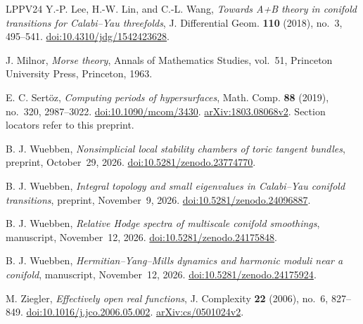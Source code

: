 \begin{thebibliography}{LPPV24}
Y.-P. Lee, H.-W. Lin, and C.-L. Wang,
\emph{Towards A+B theory in conifold transitions for Calabi--Yau threefolds},
J. Differential Geom. \textbf{110} (2018), no.~3, 495--541.
\href{https://doi.org/10.4310/jdg/1542423628}
{doi:10.4310/jdg/1542423628}.

J. Milnor, \emph{Morse theory}, Annals of Mathematics Studies,
vol.~51, Princeton University Press, Princeton, 1963.

E. C. Sert\"oz, \emph{Computing periods of hypersurfaces},
Math. Comp. \textbf{88} (2019), no.~320, 2987--3022.
\href{https://doi.org/10.1090/mcom/3430}{doi:10.1090/mcom/3430}.
\href{https://arxiv.org/abs/1803.08068v2}{arXiv:1803.08068v2}.
Section locators refer to this preprint.

B. J. Wuebben,
\emph{Nonsimplicial local stability chambers of toric tangent bundles},
preprint, October~29, 2026.
\href{https://doi.org/10.5281/zenodo.23774770}
{doi:10.5281/zenodo.23774770}.

B. J. Wuebben,
\emph{Integral topology and small eigenvalues in Calabi--Yau conifold
transitions}, preprint, November~9, 2026.
\href{https://doi.org/10.5281/zenodo.24096887}
{doi:10.5281/zenodo.24096887}.

B. J. Wuebben,
\emph{Relative Hodge spectra of multiscale conifold smoothings},
manuscript, November~12, 2026.
\href{https://doi.org/10.5281/zenodo.24175848}{doi:10.5281/zenodo.24175848}.

B. J. Wuebben,
\emph{Hermitian--Yang--Mills dynamics and harmonic moduli near a conifold},
manuscript, November~12, 2026.
\href{https://doi.org/10.5281/zenodo.24175924}{doi:10.5281/zenodo.24175924}.

M. Ziegler, \emph{Effectively open real functions},
J. Complexity \textbf{22} (2006), no.~6, 827--849.
\href{https://doi.org/10.1016/j.jco.2006.05.002}
{doi:10.1016/j.jco.2006.05.002}.
\href{https://arxiv.org/abs/cs/0501024v2}{arXiv:cs/0501024v2}.

\end{thebibliography}
